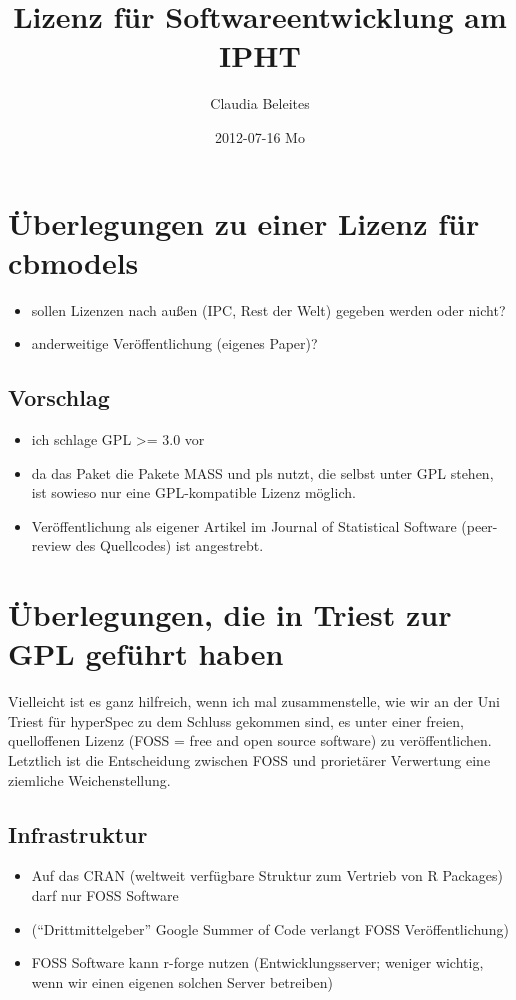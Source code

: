 \documentclass[11pt]{article}
\title{Lizenz für Softwareentwicklung am IPHT}
\author{Claudia Beleites}
\date{2012-07-16 Mo}
\begin{document}
\maketitle

\setcounter{tocdepth}{3}
\tableofcontents
\vspace*{1cm}


\section{Überlegungen zu einer Lizenz für cbmodels}
\label{sec-1}


\begin{itemize}
\item sollen Lizenzen nach außen (IPC, Rest der Welt) gegeben werden oder nicht?
\item anderweitige Veröffentlichung (eigenes Paper)?
\end{itemize}
\subsection{Vorschlag}
\label{sec-1-1}


\begin{itemize}
\item ich schlage GPL >= 3.0 vor
\item da das Paket die Pakete MASS und pls nutzt, die selbst unter GPL stehen, ist sowieso nur eine GPL-kompatible Lizenz möglich.
\item Veröffentlichung als eigener Artikel im Journal of Statistical Software (peer-review des Quellcodes) ist angestrebt.
\end{itemize}
\section{Überlegungen, die in Triest zur GPL geführt haben}
\label{sec-2}


Vielleicht ist es ganz hilfreich, wenn ich mal zusammenstelle, wie wir an der Uni Triest für
hyperSpec zu dem Schluss gekommen sind, es unter einer freien, quelloffenen Lizenz (FOSS = free and
open source software) zu veröffentlichen. Letztlich ist die Entscheidung zwischen FOSS und
prorietärer Verwertung eine ziemliche Weichenstellung.
\subsection{Infrastruktur}
\label{sec-2-1}

\begin{itemize}
\item Auf das CRAN (weltweit verfügbare Struktur zum Vertrieb von R Packages) darf nur FOSS Software
\item (``Drittmittelgeber'' Google Summer of Code verlangt FOSS Veröffentlichung)
\item FOSS Software kann r-forge nutzen (Entwicklungsserver; weniger wichtig, wenn wir einen eigenen
  solchen Server betreiben)
\end{itemize}
\end{document}

